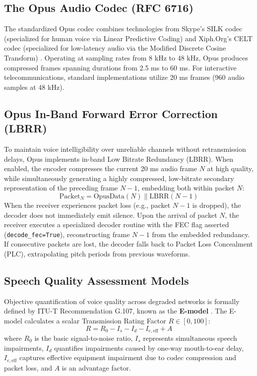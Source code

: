 \subsection{The Opus Audio Codec (RFC 6716)}
The standardized Opus codec combines technologies from Skype's SILK codec (specialized for human voice via Linear Predictive Coding) and Xiph.Org's CELT codec (specialized for low-latency audio via the Modified Discrete Cosine Transform) \cite{rfc6716}. Operating at sampling rates from 8 kHz to 48 kHz, Opus produces compressed frames spanning durations from 2.5 ms to 60 ms. For interactive telecommunications, standard implementations utilize 20 ms frames (960 audio samples at 48 kHz).

\subsection{Opus In-Band Forward Error Correction (LBRR)}
To maintain voice intelligibility over unreliable channels without retransmission delays, Opus implements in-band Low Bitrate Redundancy (LBRR). When enabled, the encoder compresses the current 20 ms audio frame $N$ at high quality, while simultaneously generating a highly compressed, low-bitrate secondary representation of the preceding frame $N-1$, embedding both within packet $N$:
\begin{equation}
    \text{Packet}_N = \text{OpusData}(N) \parallel \text{LBRR}(N-1)
\end{equation}
When the receiver experiences packet loss (e.g., packet $N-1$ is dropped), the decoder does not immediately emit silence. Upon the arrival of packet $N$, the receiver executes a specialized decoder routine with the FEC flag asserted (\texttt{decode\_fec=True}), reconstructing frame $N-1$ from the embedded redundancy. If consecutive packets are lost, the decoder falls back to Packet Loss Concealment (PLC), extrapolating pitch periods from previous waveforms.

\subsection{Speech Quality Assessment Models}
Objective quantification of voice quality across degraded networks is formally defined by ITU-T Recommendation G.107, known as the \textbf{E-model} \cite{itut_g107}. The E-model calculates a scalar Transmission Rating Factor $R \in [0, 100]$:
\begin{equation}
    R = R_0 - I_s - I_d - I_{e,\text{eff}} + A
\end{equation}
where $R_0$ is the basic signal-to-noise ratio, $I_s$ represents simultaneous speech impairments, $I_d$ quantifies impairments caused by one-way mouth-to-ear delay, $I_{e,\text{eff}}$ captures effective equipment impairment due to codec compression and packet loss, and $A$ is an advantage factor.

